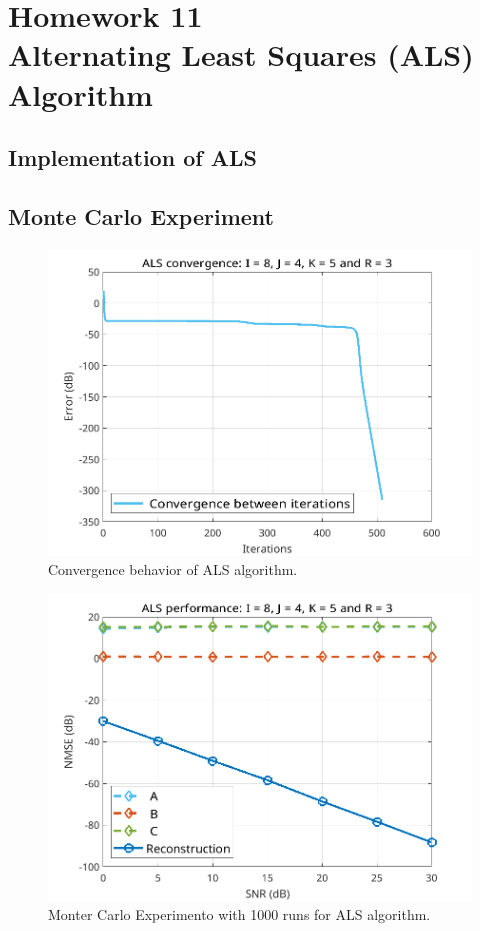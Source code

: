 \documentclass[a4paper,10pt]{article}
\begin{document}
\newpage
\section*{Homework 11 \\ Alternating Least Squares (ALS) Algorithm}

    \subsection*{Implementation of ALS}

    \subsection*{Monte Carlo Experiment}

    \begin{figure}[ht!]
        \centering 
        \includegraphics[width=0.75\linewidth]{figs/hw11a1.png} \par 
        \caption{Convergence behavior of ALS algorithm.}
        \label{fig:hw11a1} 
    \end{figure}

    \begin{figure}[ht!]
        \centering 
        \includegraphics[width=0.75\linewidth]{figs/hw11a2.png} \par 
        \caption{Monter Carlo Experimento with 1000 runs for ALS algorithm.}
        \label{fig:hw11a2} 
    \end{figure}
\end{document}
